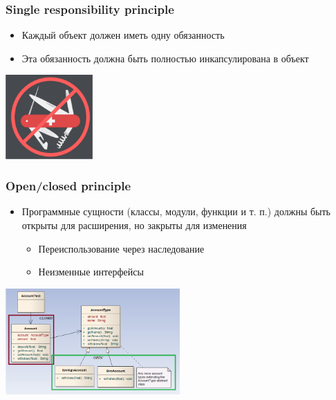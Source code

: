 \documentclass[xetex,mathserif,serif]{beamer}
\begin{document}
    \begin{frame}
        \frametitle{Single responsibility principle}
        \begin{itemize}
            \item Каждый объект должен иметь одну обязанность
            \item Эта обязанность должна быть полностью инкапсулирована в объект
        \end{itemize}
        \begin{flushright}
            \includegraphics[width=0.25\textwidth]{singleResponsibility.png}
        \end{flushright}
    \end{frame}

    \begin{frame}
        \frametitle{Open/closed principle}
        \begin{itemize}
            \item Программные сущности (классы, модули, функции и т. п.) должны быть открыты для расширения, но закрыты для изменения
            \begin{itemize}
                \item Переиспользование через наследование
                \item Неизменные интерфейсы
            \end{itemize}
        \end{itemize}
        \begin{flushright}
            \includegraphics[width=0.5\textwidth]{openClosedPrinciple.png}
        \end{flushright}
    \end{frame}
\end{document}
